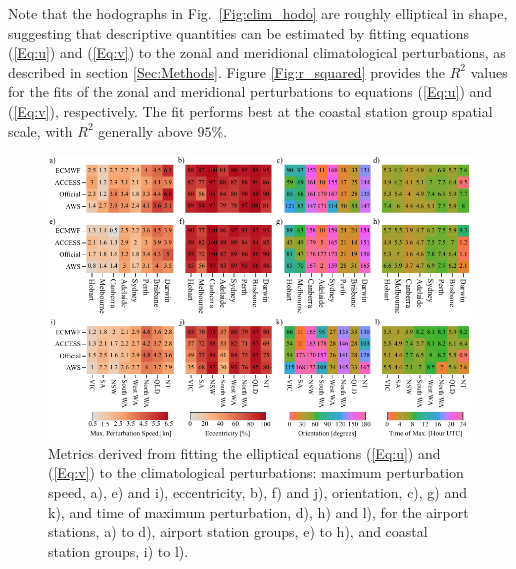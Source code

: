 \documentclass[twocol]{ametsoc}
\begin{document}
Note that the hodographs in Fig.~\ref{Fig:clim_hodo} are roughly elliptical in shape, suggesting that descriptive quantities can be estimated by fitting equations (\ref{Eq:u}) and (\ref{Eq:v}) to the zonal and meridional climatological perturbations, as described in section \ref{Sec:Methods}. Figure \ref{Fig:r_squared} provides the $R^2$ values for the fits of the zonal and meridional perturbations to equations (\ref{Eq:u}) and (\ref{Eq:v}), respectively. The fit performs best at the coastal station group spatial scale, with $R^2$ generally above $95\%$. 

\begin{figure}
\centering
\includegraphics[width=39pc]{ellipse_fits.pdf}
\caption{Metrics derived from fitting the elliptical equations (\ref{Eq:u}) and (\ref{Eq:v}) to the climatological perturbations: maximum perturbation speed, a), e) and i), eccentricity, b), f) and j), orientation, c), g) and k), and time of maximum perturbation, d), h) and l), for the airport stations, a) to d), airport station groups, e) to h), and coastal station groups, i) to l).}
\label{Fig:ellipse_fits}
\end{figure}
\end{document}
